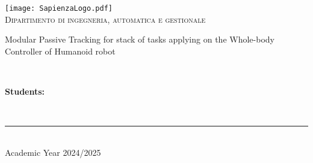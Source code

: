 \begin{titlepage}
	\centering
    \vspace*{0.5 cm}
    \texttt{[image: SapienzaLogo.pdf]}\\[1.0 cm]	%

    \vspace*{-0.4cm}
    \textsc{\large Dipartimento di ingegneria, automatica e gestionale}\\[2.0 cm]	%
    \vspace*{1cm}

    { \fontsize{20.74pt}{18.5pt}\selectfont\bfseries \thetitle \par } %

    \Large  Modular Passive Tracking for stack of tasks applying on the Whole-body Controller of Humanoid robot

    \vspace*{0.25cm}
    \vspace*{2.6cm}
	\begin{minipage}{0.4\textwidth} %
	\end{minipage}~
	\begin{minipage}{0.3\textwidth} %
		\begin{flushright} \large
		\begin{minipage}{1\textwidth}
		\begin{flushleft} \large
			\textbf{Students:} \\
			\theauthor
        \end{flushleft}
        \end{minipage}
		\end{flushright}
	\end{minipage}\\[3.85 cm]

    \vspace{2cm}
    \rule{\linewidth}{0.2 mm} \\[0.3 cm]
    \vspace*{-0.2cm}
    Academic Year 2024/2025
\end{titlepage}
